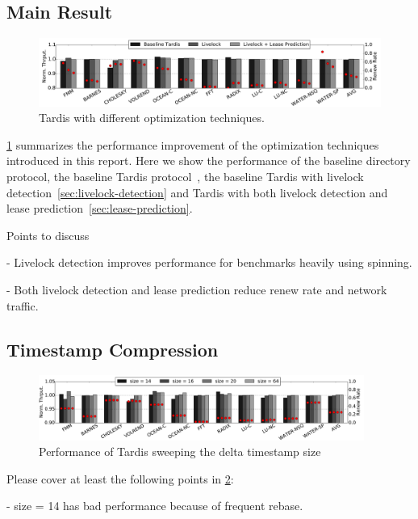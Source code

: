 \documentclass[12pt]{article}
\begin{document}
\subsection{Main Result}

\begin{figure}
	\centering
	\includegraphics[width=0.95\columnwidth]{figs/main.pdf}
	\caption{ Tardis with different optimization techniques.}
	\label{fig:main}
\end{figure}

\cref{fig:main} summarizes the performance improvement of the 
optimization techniques introduced in this report. Here we show the 
performance of the baseline directory protocol, the baseline Tardis 
protocol~\cite{yu2015}, the baseline Tardis with livelock 
detection~\cref{sec:livelock-detection} and Tardis with both livelock 
detection and lease prediction~\cref{sec:lease-prediction}.

Points to discuss

- Livelock detection improves performance for benchmarks heavily using 
  spinning.

- Both livelock detection and lease prediction reduce renew rate and 
  network traffic.
  
  


\subsection{Timestamp Compression}

\begin{figure}
	\centering
	\includegraphics[width=0.95\textwidth]{figs/tssize.pdf}
	\caption{ Performance of Tardis sweeping the delta timestamp size}
	\label{fig:tssize}
\end{figure}

Please cover at least the following points in \cref{fig:tssize}:

- size = 14 has bad performance because of frequent rebase.
\end{document}
